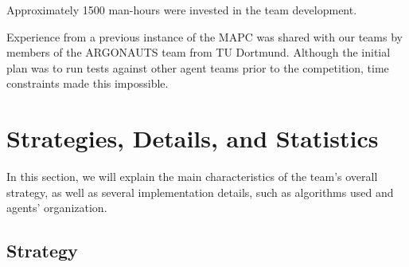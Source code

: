 \documentclass{llncs2e/llncs}
\begin{document}

    Approximately 1500 man-hours were invested in the team development.

    Experience from a previous instance of the MAPC was shared with our teams by
    members of the ARGONAUTS team from TU Dortmund\cite{Holzgen:2011}. Although
    the initial plan was to run tests against other agent teams prior to the
    competition, time constraints made this impossible.



\section{Strategies, Details, and Statistics}

    
    In this section, we will explain the main characteristics of the team's 
	overall strategy, as well as several implementation details, such as 
	algorithms used and agents' organization.

\subsection{Strategy}
\end{document}
